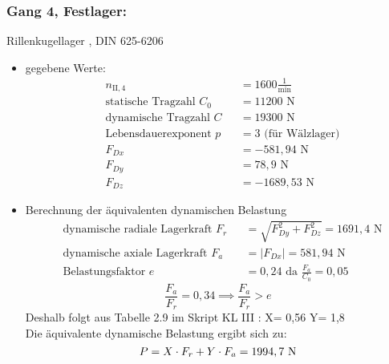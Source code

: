 \subsubsection{Gang 4, Festlager:} Rillenkugellager , DIN 625-6206\\
\begin{itemize}
	\item gegebene Werte:
	\begin{align*}
	&n_{{\mathord{\mathrm{II}},4}} &&=  1600 \frac{1}{\text{min}} \\
	&\text{statische Tragzahl } C_{0} &&= 11200 \text{ N}\\
	&\text{dynamische Tragzahl } C &&= 19300 \text{ N} \\
	&\text{Lebensdauerexponent } p &&= 3 \text{ (für Wälzlager)} \\
	&F_{Dx} && = -581,94 \text{ N}\\
	&F_{Dy} && = 78,9 \text{ N}\\
	&F_{Dz} && = -1689,53 \text{ N}
	\end{align*} 
	\item Berechnung der äquivalenten dynamischen Belastung
	\begin{align*}
	&\text{dynamische radiale Lagerkraft } F_r&& = \sqrt{F_{Dy}^2 + F_{Dz}^2 } =1691,4\text{ N} \\
	&\text{dynamische axiale Lagerkraft } F_a&& = |F_{Dx}| = 581,94 \text{ N}\\
	&\text{Belastungsfaktor } e &&= 0,24 \text{ da } \frac{F_a}{C_0} = 0,05
	\end{align*} 
	\[\frac{F_a}{F_r} = 0,34 \implies \frac{F_a}{F_r} > e\]
	Deshalb folgt aus Tabelle 2.9 im Skript KL III : X= 0,56 \text{, } Y= 1,8 \\
	Die äquivalente dynamische Belastung ergibt sich zu: 
	\[
	P= X \cdot F_r + Y \cdot F_a= 1994,7 \text{ N}
	\]
\end{itemize}
\newpage
